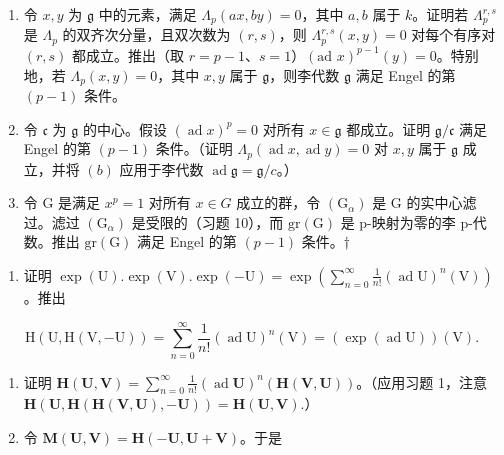 \begin{enumerate}
\def\labelenumi{(\alph{enumi})}
\setcounter{enumi}{1}
\item
  令 \(x, y\) 为 \(\mathfrak{g}\) 中的元素，满足 \(\Lambda_p(ax, by) = 0\)，其中 \(a, b\) 属于 \(k\)。证明若 \(\Lambda_p^{r,s}\) 是 \(\Lambda_p\) 的双齐次分量，且双次数为 \((r, s)\)，则 \(\Lambda_p^{r,s}(x, y) = 0\) 对每个有序对 \((r, s)\) 都成立。推出（取 \(r = p - 1\)、\(s = 1\)）\((\text{ad } x)^{p-1}(y) = 0\)。特别地，若 \(\Lambda_p(x, y) = 0\)，其中 \(x, y\) 属于 \(\mathfrak{g}\)，则李代数 \(\mathfrak{g}\) 满足 Engel 的第 \((p - 1)\) 条件。
\item
  令 \(\mathfrak{c}\) 为 \(\mathfrak{g}\) 的中心。假设 \((\operatorname{ad} x)^p = 0\) 对所有 \(x \in \mathfrak{g}\) 都成立。证明 \(\mathfrak{g} / \mathfrak{c}\) 满足 Engel 的第 \((p - 1)\) 条件。（证明 \(\Lambda_p(\operatorname{ad} x, \operatorname{ad} y) = 0\) 对 \(x, y\) 属于 \(\mathfrak{g}\) 成立，并将 \((b)\) 应用于李代数 \(\operatorname{ad} \mathfrak{g} = \mathfrak{g} / c\)。）
\item
  令 G 是满足 \(x^{p}=1\) 对所有 \(x\in G\) 成立的群，令 \((\mathrm{G}_{\alpha})\) 是 G 的实中心滤过。滤过 \((\mathrm{G}_{\alpha})\) 是受限的（习题 10），而 \(\mathrm{gr}(\mathrm{G})\) 是 p-映射为零的李 p-代数。推出 \(\mathrm{gr}(\mathrm{G})\) 满足 Engel 的第 \((p-1)\) 条件。†
\end{enumerate}


\begin{enumerate}
\def\labelenumi{\arabic{enumi}.}
\tightlist
\item
  证明 \(\exp (\mathrm{U}).\exp (\mathrm{V}).\exp (-\mathrm{U}) = \exp \left(\sum_{n = 0}^{\infty}\frac{1}{n!} (\operatorname {ad}\mathrm{U})^{n}(\mathrm{V})\right)\)。推出
\end{enumerate}

\[
\mathrm{H} (\mathrm{U}, \mathrm{H} (\mathrm{V}, - \mathrm{U})) = \sum_ {n = 0} ^ {\infty} \frac {1}{n !} (\operatorname{ad} \mathrm{U}) ^ {n} (\mathrm{V}) = (\exp (\operatorname{ad} \mathrm{U})) (\mathrm{V}).
\]

\begin{enumerate}
\def\labelenumi{\arabic{enumi}.}
\setcounter{enumi}{1}
\item
  证明 \(\mathbf{H}(\mathbf{U},\mathbf{V}) = \sum_{n = 0}^{\infty}\frac{1}{n!} (\operatorname {ad}\mathbf{U})^{n}(\mathbf{H}(\mathbf{V},\mathbf{U}))\)。（应用习题 1，注意 \(\mathbf{H}(\mathbf{U},\mathbf{H}(\mathbf{H}(\mathbf{V},\mathbf{U}), - \mathbf{U})) = \mathbf{H}(\mathbf{U},\mathbf{V}).\)）
\item
  令 \(\mathbf{M}(\mathbf{U},\mathbf{V}) = \mathbf{H}(-\mathbf{U},\mathbf{U} + \mathbf{V})\)。于是
\end{enumerate}

